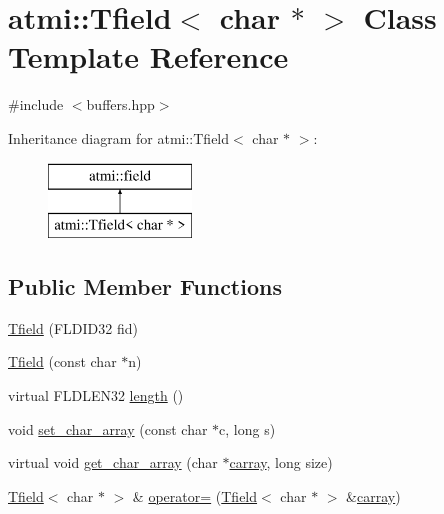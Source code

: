 \hypertarget{classatmi_1_1_tfield_3_01char_01_5_01_4}{}\section{atmi\+:\+:Tfield$<$ char $\ast$ $>$ Class Template Reference}
\label{classatmi_1_1_tfield_3_01char_01_5_01_4}


{\ttfamily \#include $<$buffers.\+hpp$>$}

Inheritance diagram for atmi\+:\+:Tfield$<$ char $\ast$ $>$\+:\begin{figure}[H]
\begin{center}
\leavevmode
\includegraphics[height=2.000000cm]{classatmi_1_1_tfield_3_01char_01_5_01_4}
\end{center}
\end{figure}
\subsection*{Public Member Functions}
\begin{DoxyCompactItemize}
\item 
\hyperlink{classatmi_1_1_tfield_3_01char_01_5_01_4_ad16891d15a65e85408962ec962e57bd8}{Tfield} (F\+L\+D\+I\+D32 fid)
\item 
\hyperlink{classatmi_1_1_tfield_3_01char_01_5_01_4_a197bf4f86d8053adcf8afdcd839b85cc}{Tfield} (const char $\ast$n)
\item 
virtual F\+L\+D\+L\+E\+N32 \hyperlink{classatmi_1_1_tfield_3_01char_01_5_01_4_aa97dec8559724186b62997409f04bf3f}{length} ()
\item 
void \hyperlink{classatmi_1_1_tfield_3_01char_01_5_01_4_a57def5d907b0f5671a5dae41bccd64f1}{set\+\_\+char\+\_\+array} (const char $\ast$c, long s)
\item 
virtual void \hyperlink{classatmi_1_1_tfield_3_01char_01_5_01_4_a9ba99e63bbc32091f3a0614b2fe186fe}{get\+\_\+char\+\_\+array} (char $\ast$\hyperlink{group__fml_ga8b57f9a4e2453d8e5d82ac0016e35e87}{carray}, long size)
\item 
\hyperlink{classatmi_1_1_tfield}{Tfield}$<$ char $\ast$ $>$ \& \hyperlink{classatmi_1_1_tfield_3_01char_01_5_01_4_a486559e383ca6ae8002cb527901b716f}{operator=} (\hyperlink{classatmi_1_1_tfield}{Tfield}$<$ char $\ast$ $>$ \&\hyperlink{group__fml_ga8b57f9a4e2453d8e5d82ac0016e35e87}{carray})
\end{DoxyCompactItemize}
